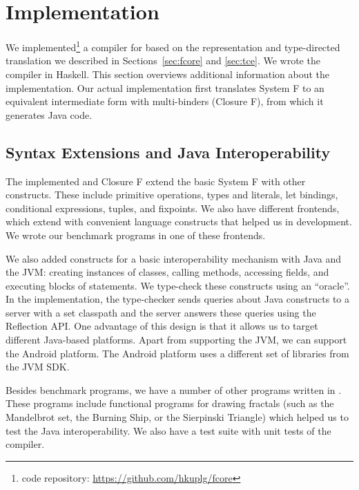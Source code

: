 \section{Implementation}\label{sec:implementation}

We implemented\footnote{\name code repository: \url{https://github.com/hkuplg/fcore}} a compiler for \name based on the
representation and type-directed translation we described in
Sections~\ref{sec:fcore} and \ref{sec:tce}.  We wrote the compiler
in Haskell. This section overviews additional information about the
implementation. Our actual implementation first translates System F
to an equivalent intermediate form with multi-binders (Closure F),
from which it generates Java code.

\subsection{Syntax Extensions and Java Interoperability}
The implemented \name and Closure F extend the basic 
System F with other constructs. These include primitive
operations, types and literals, let bindings, conditional expressions,
tuples, and fixpoints. We also have different frontends, 
which extend \name with convenient language constructs that helped us in development.
We wrote our benchmark programs in one 
of these frontends. 

We also added constructs for a basic interoperability mechanism with
Java and the JVM: creating instances of classes, calling methods,
accessing fields, and executing blocks of statements.  We type-check these constructs
using an ``oracle''.  In the implementation, the type-checker sends
queries about Java constructs to a server with a set classpath and the
server answers these queries using the Reflection
API. One advantage of this design is that it allows
us to target different Java-based platforms. Apart from supporting the
JVM, we can support the Android platform. The Android platform
uses a different set of libraries from the JVM SDK. 

Besides benchmark programs, we have a number of other programs written 
in \Name. These programs include functional programs for 
drawing fractals (such as the Mandelbrot set, the Burning Ship, or the
Sierpinski Triangle) which helped us to test the Java interoperability.
We also have a test suite with unit tests of the \name compiler.


